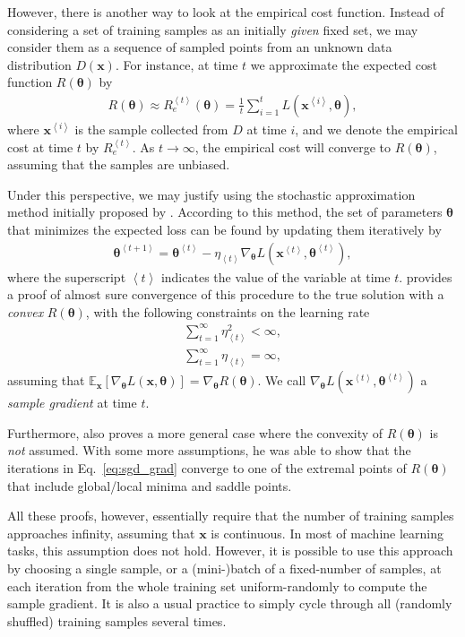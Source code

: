 \documentclass[dissertation,nocontribution,draft*]{aaltoseries}
\newcommand{\qexp}[1]{\left<#1\right>}
\newcommand{\vect}[1]{\mathbf{#1}}
\newcommand{\vects}[1]{\boldsymbol{#1}}
\newcommand{\vx}[0]{\vect{x}}
\newcommand{\TT}[0]{{\vects{\theta}}}
\newcommand{\E}[0]{\mathbb{E}}
\begin{document}
However, there is another way to look at the empirical cost
function. Instead of considering a set of training samples
as an initially \textit{given} fixed set, we may consider
them as a sequence of sampled points from an unknown
data distribution $D(\vx)$. For instance, at time $t$ we
approximate the expected cost function $R(\TT)$ by
\begin{align*}
    R(\TT) \approx R_e^{\qexp{t}}(\TT) = \frac{1}{t}
    \sum_{i=1}^t L(\vx^{\qexp{i}}, \TT),
\end{align*}
where $\vx^{\qexp{i}}$ is the sample collected from $D$ at time
$i$, and we denote the empirical cost at time $t$ by
$R_e^{\qexp{t}}$. As $t\to\infty$, the empirical cost will
converge to $R(\TT)$, assuming that the samples are unbiased.

Under this perspective, we may justify using the stochastic
approximation method initially proposed by
\citet{Robbins1951}.  According to this method, the set of
parameters $\TT$ that minimizes the expected loss can be
found by updating them iteratively by
\begin{align}
    \label{eq:sgd_grad}
    \TT^{\qexp{t+1}} = \TT^{\qexp{t}} - \eta_{\qexp{t}}
    \nabla_{\TT} L(\vx^{\qexp{t}},
    \TT^{\qexp{t}}),
\end{align}
where the superscript $\qexp{t}$ indicates the value of the
variable at time $t$. \citet{Bottou1998} provides a proof of
almost sure convergence of this procedure to the true
solution with a \textit{convex} $R(\TT)$, with the following
constraints on the learning rate
\begin{align}
    \label{eq:sgd_lr_cond1}
    \sum_{t=1}^\infty \eta_{\qexp{t}}^2 < \infty, \\
    \label{eq:sgd_lr_cond2}
    \sum_{t=1}^\infty \eta_{\qexp{t}} = \infty,
\end{align}
assuming that $\E_\vx \left[ \nabla_{\TT} L(\vx, \TT) \right] =
\nabla_\TT R(\TT)$. We call $\nabla_{\TT} L(\vx^{\qexp{t}},
\TT^{\qexp{t}})$ a \textit{sample gradient} at time $t$.

Furthermore, \citet{Bottou1998} also proves a more general
case where the convexity of $R(\TT)$ is \textit{not}
assumed. With some more assumptions, he was able to show
that the iterations in Eq.~\eqref{eq:sgd_grad} converge to
one of the extremal points of $R(\TT)$ that include
global/local minima and saddle points.

All these proofs, however, essentially require that the
number of training samples approaches infinity, assuming
that $\vx$ is continuous. In most of machine learning tasks,
this assumption does not hold. However, it is possible to
use this approach by choosing a single sample, or a (mini-)batch of
a fixed-number of samples, at each iteration from the whole
training set uniform-randomly to compute the sample
gradient. It is also a usual practice to simply cycle
through all (randomly shuffled) training samples several
times.
\end{document}
